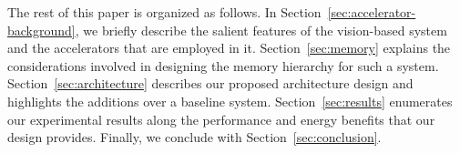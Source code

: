 The rest of this paper is organized as follows.
In Section~\ref{sec:accelerator-background}, we briefly describe the salient features of the vision-based system and the accelerators that are employed in it. 
Section~\ref{sec:memory} explains the considerations involved in designing the memory hierarchy for such a system.
Section~\ref{sec:architecture} describes our proposed architecture design and highlights the additions over a baseline system.
Section~\ref{sec:results} enumerates our experimental results along the performance and energy benefits that our design provides. Finally, we conclude with Section~\ref{sec:conclusion}.


